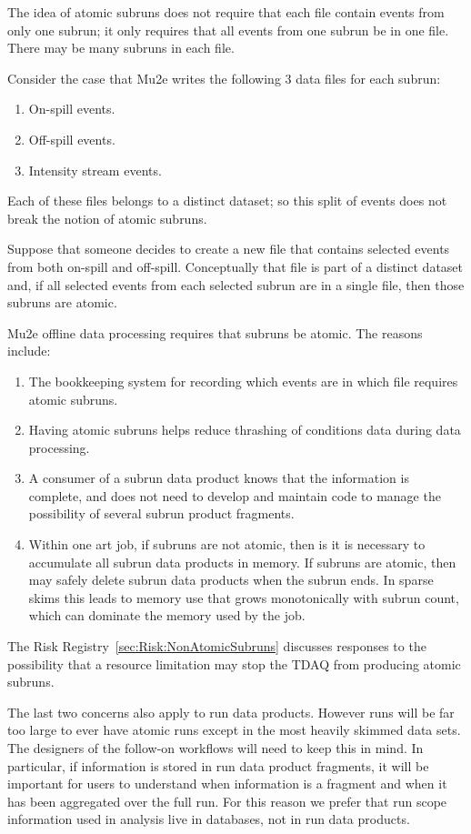 The idea of atomic subruns does not require that each file contain events
from only one subrun;
it only requires that all events from one subrun be in one file.
There may be many subruns in each file.

Consider the case that Mu2e writes the following 3 data files for each subrun:
\begin{enumerate}
\item On-spill events.
\item Off-spill events.
\item Intensity stream events.
\end{enumerate}
Each of these files belongs to a distinct dataset; so this split of events does not break the notion
of atomic subruns.

Suppose that someone decides to create a new file that contains selected events from both on-spill
and off-spill.  Conceptually that file is part of a distinct dataset and, if all selected events from
each selected subrun are in a single file, then those subruns are atomic.

Mu2e offline data processing requires that subruns be atomic.  The reasons include:
\begin{enumerate}
\item The bookkeeping system for recording which events are in which file requires atomic subruns.
\item Having atomic subruns helps reduce thrashing of conditions data during data processing.
\item A consumer of a subrun data product knows that the information is complete, and does not need
  to develop and maintain code to manage the possibility of several subrun product fragments.
\item Within one art job, if subruns are not atomic,
  then is it is necessary to accumulate all subrun data products in memory.
  If subruns are atomic, then \art may safely delete subrun data products when the subrun ends.
  In sparse skims this leads to memory use that grows monotonically with subrun count,
  which can dominate the memory used by the job.
\end{enumerate}

The Risk Registry~\ref{sec:Risk:NonAtomicSubruns} discusses responses to the possibility
that a resource limitation may stop the TDAQ from producing atomic subruns.

The last two concerns also apply to run data products.
However runs will be far too large to ever have atomic runs except in the most heavily skimmed data sets.
The designers of the follow-on workflows will need to keep this in mind.
In particular, if information is stored in run data product fragments, it will be important for users
to understand when information is a fragment and when it has been aggregated over the full run.
For this reason we prefer that run scope information used in analysis live in databases, not in run data products.

